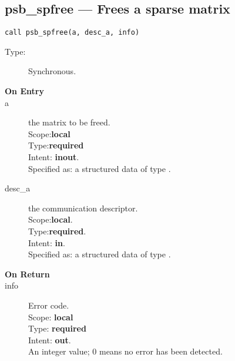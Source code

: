 


%
%
\clearpage\subsection*{psb\_spfree --- Frees a sparse matrix}

\begin{verbatim}
call psb_spfree(a, desc_a, info)
\end{verbatim}

\begin{description}
\item[Type:] Synchronous.
\item[\bf On Entry]
\item[a] the matrix to be freed.\\
Scope:{\bf local}\\
Type:{\bf required}\\
Intent: {\bf inout}.\\
Specified as: a structured data of type \spdata.
\item[desc\_a] the communication descriptor.\\
Scope:{\bf local}.\\
Type:{\bf required}.\\
Intent: {\bf in}.\\
Specified as: a structured data of type \descdata.
\end{description}

\begin{description}
\item[\bf On Return]
\item[info] Error code.\\
Scope: {\bf local} \\
Type: {\bf required} \\
Intent: {\bf out}.\\
An integer value; 0 means no error has been detected. 
\end{description}




